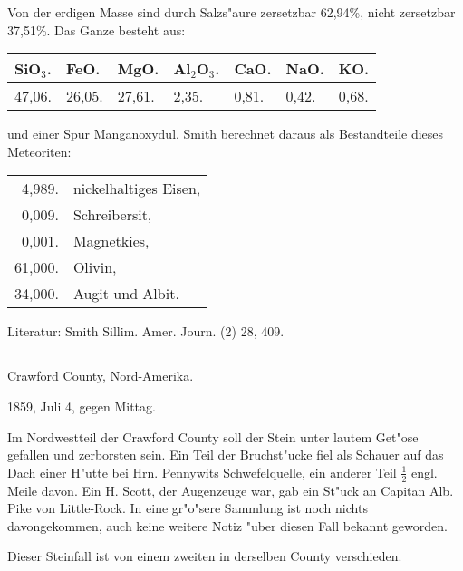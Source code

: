 \documentclass[a4paper, 11pt, oneside]{article}
\begin{document}
Von der erdigen Masse sind durch Salzs"aure zersetzbar 62,94\%, nicht zersetzbar 37,51\%. Das Ganze besteht aus:
\begin{table}[H]
    \centering\swabfamily\Large
    \begin{tabular}{l l l l l l l}
        SiO$_{3}$. & FeO. & MgO. & Al$_{2}$O$_{3}$. & CaO. & NaO. & KO. \\ \hline
        47,06. & 26,05. & 27,61. & 2,35. & 0,81. & 0,42. & 0,68. \\
    \end{tabular}
\end{table}

und einer Spur Manganoxydul. Smith berechnet daraus als Bestandteile dieses Meteoriten:
\begin{table}[H]
    \centering\swabfamily\Large
    \begin{tabular}{r l}
        4,989. & nickelhaltiges Eisen, \\
        0,009. & Schreibersit, \\
        0,001. & Magnetkies, \\
        61,000. & Olivin, \\
        34,000. & Augit und Albit. \\
    \end{tabular}
\end{table}

\normalsize
Literatur: Smith Sillim. Amer. Journ. (2) 28, 409.

\subsection{}
\LARGE
\paragraph{}
Crawford County, Nord-Amerika.

1859, Juli 4, gegen Mittag.

Im Nordwestteil der Crawford County soll der Stein unter lautem Get"ose gefallen und zerborsten sein. Ein Teil der Bruchst"ucke fiel als Schauer auf das Dach einer H"utte bei Hrn. Pennywits Schwefelquelle, ein anderer Teil $\mathfrak{\frac{1}{2}}$ engl. Meile davon. Ein H. Scott, der Augenzeuge war, gab ein St"uck an Capitan Alb. Pike von Little-Rock. In eine gr"o"sere Sammlung ist noch nichts davongekommen, auch keine weitere Notiz "uber diesen Fall bekannt geworden.

Dieser Steinfall ist von einem zweiten in derselben County verschieden.
\end{document}
